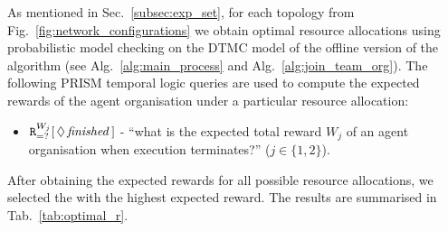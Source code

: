 \documentclass{llncs}
\begin{document}
As mentioned in Sec.~\ref{subsec:exp_set}, for each topology from Fig.~\ref{fig:network_configurations} we obtain optimal resource allocations using probabilistic model checking on the DTMC model of the offline version of the algorithm (see Alg.~\ref{alg:main_process} and Alg.~\ref{alg:join_team_org}). The following PRISM temporal logic queries are used to compute the expected rewards of the agent organisation under a particular resource allocation:
\begin{itemize}
 \item ${\tt R}_{=?}^{W_{j}}[\,\Diamond\,\mathit{finished}\,]$ -
``what is the expected total reward  $W_j$ of an agent organisation when execution terminates?'' ($j\in\{1,2\}$).
\end{itemize}
After obtaining the expected rewards for all possible resource allocations, we selected the with the highest expected reward. The results are summarised in Tab.~\ref{tab:optimal_r}.
\begin{table}[h]
\centering
{}
\caption{Model comparison for different numbers of agents in a fully connected agent organisation for the offline version of Alg.~\ref{alg:join_team_org}.}
\label{tab:model_sizes}
\end{table}
\end{document}

